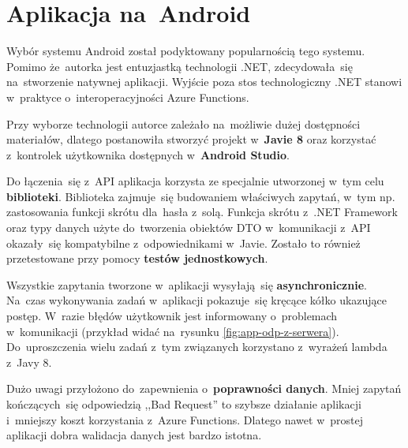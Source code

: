 \documentclass[12pt,a4paper,twoside,titlepage,openright]{book}
\begin{document}
\section{Aplikacja na~Android}

Wybór systemu Android został podyktowany popularnością tego systemu. Pomimo że~autorka jest entuzjastką technologii .NET, zdecydowała~się na~stworzenie natywnej aplikacji. Wyjście poza stos technologiczny .NET stanowi w~praktyce o~interoperacyjności Azure Functions.

Przy wyborze technologii autorce zależało na~możliwie dużej dostępności materiałów, dlatego postanowiła stworzyć projekt w~\textbf{Javie 8} oraz korzystać z~kontrolek użytkownika dostępnych w~\textbf{Android Studio}. 

Do łączenia~się z~API aplikacja korzysta ze specjalnie utworzonej w~tym celu \textbf{biblioteki}. Biblioteka zajmuje~się budowaniem właściwych zapytań, w~tym np. zastosowania funkcji skrótu dla~hasła z~solą. Funkcja skrótu z~.NET Framework oraz typy danych użyte do~tworzenia obiektów DTO w~komunikacji z~API okazały~się kompatybilne z~odpowiednikami w~Javie. Zostało to również przetestowane przy pomocy \textbf{testów jednostkowych}.

Wszystkie zapytania tworzone w~aplikacji wysyłają~się \textbf{asynchronicznie}. Na~czas wykonywania zadań w~aplikacji pokazuje~się kręcące kółko ukazujące postęp. W~razie błędów użytkownik jest informowany o~problemach w~komunikacji (przykład widać na~rysunku \ref{fig:app-odp-z-serwera}). Do~uproszczenia wielu zadań z~tym związanych korzystano z~wyrażeń lambda z~Javy 8.

Dużo uwagi przyłożono do~zapewnienia o~\textbf{poprawności danych}. Mniej zapytań kończących~się odpowiedzią ,,Bad Request'' to szybsze działanie aplikacji i~mniejszy koszt korzystania z~Azure Functions. Dlatego nawet w~prostej aplikacji dobra walidacja danych jest bardzo istotna.
\end{document}
